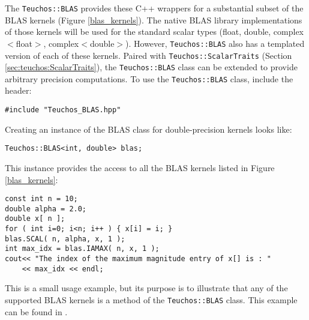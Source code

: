 The \verb!Teuchos::BLAS! provides these C++ wrappers for a substantial subset of the 
BLAS kernels (Figure \ref{blas_kernels}).
The native BLAS library implementations of those kernels
will be used for the standard scalar types (float, double, complex$<$float$>$, complex$<$double$>$).  
However, \verb!Teuchos::BLAS! also has a
templated version of each of these kernels.  Paired with \verb!Teuchos::ScalarTraits! 
(Section \ref{sec:teuchos:ScalarTraits}), the \verb!Teuchos::BLAS! class can be extended 
to provide arbitrary precision computations.  
To use the \verb!Teuchos::BLAS! class, 
include the header:
{\small 
\begin{verbatim}
#include "Teuchos_BLAS.hpp"
\end{verbatim}}
Creating an instance of the BLAS class for double-precision kernels looks like:
{\small 
\begin{verbatim}
Teuchos::BLAS<int, double> blas;
\end{verbatim}}
This instance provides the access to all the BLAS kernels listed in Figure \ref{blas_kernels}:
{\small
\begin{verbatim}
const int n = 10;
double alpha = 2.0;
double x[ n ];
for ( int i=0; i<n; i++ ) { x[i] = i; }
blas.SCAL( n, alpha, x, 1 );
int max_idx = blas.IAMAX( n, x, 1 );
cout<< "The index of the maximum magnitude entry of x[] is : "
    << max_idx << endl;
\end{verbatim}}
This is a small usage example, but its purpose is to illustrate that any of the supported 
BLAS kernels is a method of the {\tt Teuchos::BLAS} class.  
This example can be found in .  

